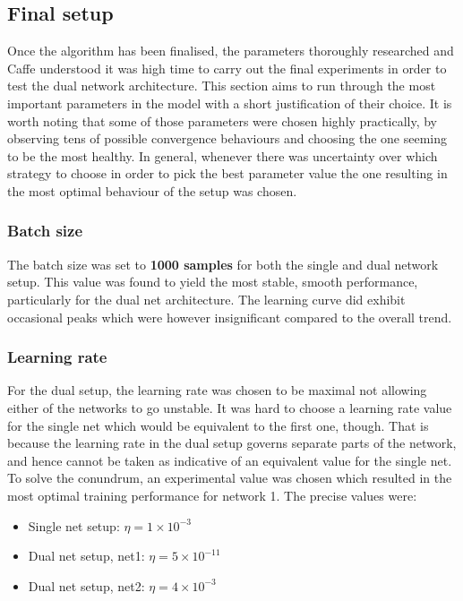 \documentclass[a4paper, 12pt]{article}
\numberwithin{equation}{section}
\begin{document}
		
	\subsection{Final setup}
	
	Once the algorithm has been finalised, the parameters thoroughly researched and Caffe understood it was high time to carry out the final experiments in order to test the dual network architecture. This section aims to run through the most important parameters in the model with a short justification of their choice. It is worth noting that some of those parameters were chosen highly practically, by observing tens of possible convergence behaviours and choosing the one seeming to be the most healthy. In general, whenever there was uncertainty over which strategy to choose in order to pick the best parameter value the one resulting in the most optimal behaviour of the setup was chosen.
	
	\subsubsection{Batch size}
	
	The batch size was set to \textbf{1000 samples} for both the single and dual network setup. This value was found to yield the most stable, smooth performance, particularly for the dual net architecture. The learning curve did exhibit occasional peaks which were however insignificant compared to the overall trend.
	
	\subsubsection{Learning rate}
	
	For the dual setup, the learning rate was chosen to be maximal not allowing either of the networks to go unstable. It was hard to choose a learning rate value for the single net which would be equivalent to the first one, though. That is because the learning rate in the dual setup governs separate parts of the network, and hence cannot be taken as indicative of an equivalent value for the single net. To solve the conundrum, an experimental value was chosen which resulted in the most optimal training performance for network 1. The precise values were:
	
	\begin{itemize}
		\item Single net setup: $\eta=1\times10^{-3}$
		\item Dual net setup, net1: $\eta=5\times10^{-11}$
		\item Dual net setup, net2: $\eta=4\times10^{-3}$
	\end{itemize}
	
\end{document}
